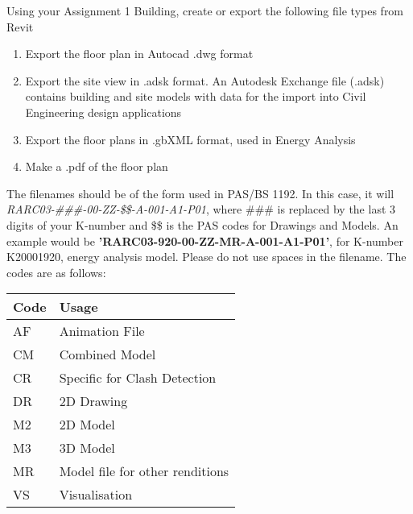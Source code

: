 Using your Assignment 1 Building, create or export the following file types from Revit
\begin{enumerate}
	\item Export the floor plan in Autocad .dwg format
	\item Export the site view in .adsk format.  An Autodesk Exchange file (.adsk) contains building and site models with data for the import into Civil Engineering design applications
	\item Export the floor plans in .gbXML format, used in Energy Analysis
	\item Make a .pdf of the floor plan
\end{enumerate}
The filenames should be of the form used in PAS/BS 1192.  In this case, it will \textit{RARC03-\#\#\#-00-ZZ-\$\$-A-001-A1-P01}, where \#\#\# is replaced by the last 3 digits of your K-number and \$\$ is the PAS codes for Drawings and Models. An example would be \textbf{'RARC03-920-00-ZZ-MR-A-001-A1-P01'}, for K-number K20001920, energy analysis model.  Please do not use spaces in the filename. The codes are as follows: \\

\begin{tabularx}{\textwidth}{ |X|X| }
	\hline
	\textbf{Code} & \textbf{Usage} \\
	\hline 
	AF  & Animation File  \\
	CM  & Combined Model  \\
	CR  & Specific for Clash Detection  \\
	DR  & 2D Drawing  \\
	M2  & 2D Model  \\
	M3  & 3D Model  \\
	MR  & Model file for other renditions  \\
	VS  & Visualisation  \\
	\hline
\end{tabularx}


